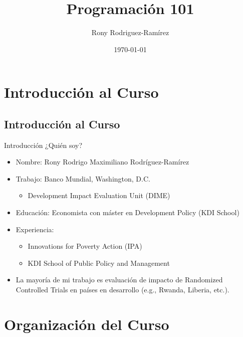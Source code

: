 \documentclass[11pt, aspectratio=169, compress]{beamer}
\title{Programación 101}
\author{Rony Rodriguez-Ramírez}
\institute{The World Bank | DIME \\ LAMBDA}
\date{\today}
\begin{document}
	
\begin{frame}[plain]
	\maketitle 
\end{frame}

\section{Introducción al Curso}
\subsection{Introducción al Curso}
\begin{frame}{Introducción}
	¿Quién soy? 
	\begin{itemize}
		\item Nombre: Rony Rodrigo Maximiliano Rodríguez-Ramírez
		\item Trabajo: Banco Mundial, Washington, D.C.  
		\begin{itemize}
			\item Development Impact Evaluation Unit (DIME)
		\end{itemize}
		\item Educación: Economista con máster en Development Policy (KDI School)
		\item Experiencia: 
		\begin{itemize}
			\item Innovations for Poverty Action (IPA)
			\item KDI School of Public Policy and Management
		\end{itemize} 
		\item La mayoría de mi trabajo es evaluación de impacto de Randomized Controlled Trials en países en desarrollo (e.g., Rwanda, Liberia, etc.).
	\end{itemize}
\end{frame}
\section{Organización del Curso}
\end{document}
